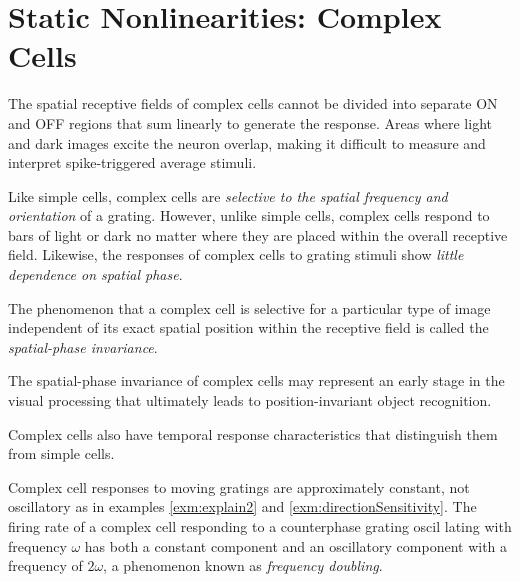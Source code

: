 
\section{ Static Nonlinearities: Complex Cells}
\label{sec: StaticNonlinearitiesForComplexCells}

\begin{rem}
  The spatial receptive fields of complex cells cannot be divided into separate ON and OFF regions that sum linearly to generate the response. Areas where light and dark images excite the neuron overlap, making it difficult to measure and interpret spike-triggered average stimuli.
\end{rem}

\begin{prin}
  \label{prin:complexCellSpatialResponse}
  Like simple cells, complex cells are \emph{selective to the spatial frequency and orientation} of a grating. However, unlike simple cells, complex cells respond to bars of light or dark no matter where they are placed within the overall receptive field. Likewise, the responses of complex cells to grating stimuli show \emph{little dependence on spatial phase}.
\end{prin}

\begin{defn}
  The phenomenon that a complex cell is selective for a particular type of image independent of its exact spatial position within the receptive field is called the \emph{spatial-phase invariance}.
\end{defn}

\begin{rem}
  The spatial-phase invariance of complex cells may represent an early stage in the visual processing that ultimately leads to position-invariant object recognition.
\end{rem}

\begin{rem}
  Complex cells also have temporal response characteristics that distinguish them from simple cells.
\end{rem}

\begin{prin}
  \label{prin:complexCellTemporalResponse}
  Complex cell responses to moving gratings are approximately constant, not oscillatory as in examples \ref{exm:explain2} and \ref{exm:directionSensitivity}. The firing rate of a complex cell responding to a counterphase grating oscil lating with frequency $\omega$ has both a constant component and an oscillatory component with a frequency of $2\omega$, a phenomenon known as \emph{frequency doubling}.
\end{prin}

